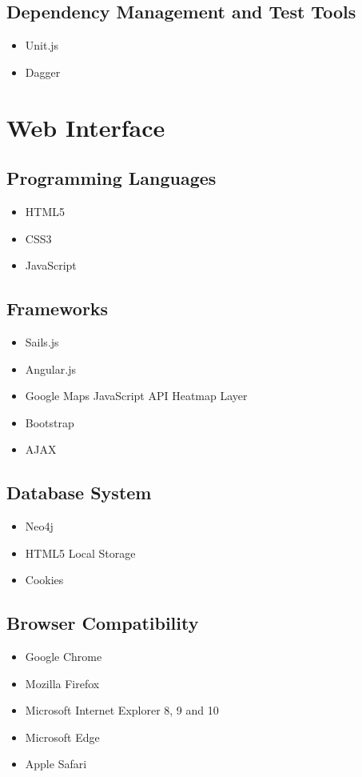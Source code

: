 \documentclass[11pt,fleqn]{book} %
\begin{document}
	\subsection{Dependency Management and Test Tools}
	\begin{itemize}
		\item Unit.js
		\item Dagger
	\end{itemize}
	\section{Web Interface}
	\subsection{Programming Languages}
	\begin{itemize}
		\item HTML5
		\item CSS3
		\item JavaScript
	\end{itemize}
	\subsection{Frameworks}
	\begin{itemize}
		\item Sails.js
		\item Angular.js
		\item Google Maps JavaScript API Heatmap Layer
		\item Bootstrap
		\item AJAX					
	\end{itemize}
	\subsection{Database System}
	\begin{itemize}
		\item Neo4j
		\item HTML5 Local Storage
		\item Cookies				
	\end{itemize}
	\subsection{Browser Compatibility}
	\begin{itemize}
		\item Google Chrome
		\item Mozilla Firefox
		\item Microsoft Internet Explorer 8, 9 and 10
		\item Microsoft Edge
		\item Apple Safari						
	\end{itemize}
\end{document}
